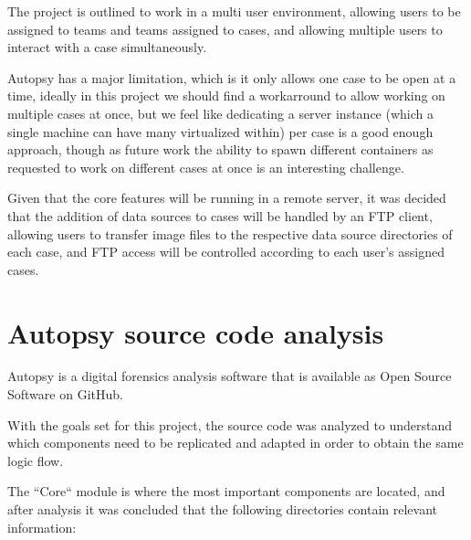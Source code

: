 The project is outlined to work in a multi user environment, allowing users to be assigned to teams and teams assigned to cases, and allowing multiple users to interact with
a case simultaneously.

Autopsy has a major limitation, which is it only allows one case to be open at a time, ideally in this project we should find a workarround to allow working on multiple cases
at once, but we feel like dedicating a server instance (which a single machine can have many virtualized within) per case is a good enough approach, though as future work the
ability to spawn different containers as requested to work on different cases at once is an interesting challenge.

Given that the core features will be running in a remote server, it was decided that the addition of data sources to cases will be handled by an FTP client, allowing users
to transfer image files to the respective data source directories of each case, and FTP access will be controlled according to each user's assigned cases.

\section{Autopsy source code analysis}

Autopsy is a digital forensics analysis software that is available as Open Source Software on GitHub.

With the goals set for this project, the source code was analyzed to understand which components need to be replicated and adapted in order to obtain the same logic flow.

The ``Core`` module is where the most important components are located, and after analysis it was concluded that the following directories contain relevant information:

